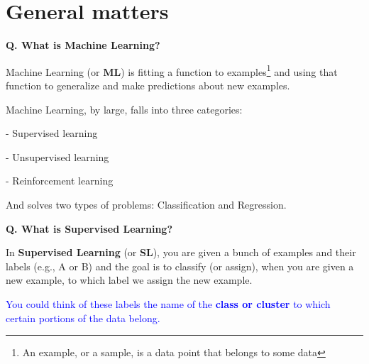 \section{General matters}
\begin{frame}[fragile]{\textbf{Q. What is Machine Learning?}}
  \begin{wideitemize}
    \item Machine Learning (or \textbf{ML}) is fitting a function to
    examples\footnote{An example, or a sample, is a data point that belongs
    to some data} and using that function to generalize and make predictions
    about new examples.
    \item Machine Learning, by large, falls into three categories:\vspace{.4em}
    \begin{wideitemize}
      \item[-] Supervised learning
      \item[-] Unsupervised learning
      \item[-] Reinforcement learning
    \end{wideitemize}
    \item And solves two types of problems: Classification and Regression.
  \end{wideitemize}
\end{frame}

\begin{frame}[fragile]{\textbf{Q. What is Supervised Learning?}}
  \begin{wideitemize}
    \item In \textbf{Supervised Learning} (or \textbf{SL}), you are given a
    bunch of examples and their labels (e.g., A or B) and the goal is to
    classify (or assign), when you are given a new example, to which label we
    assign the new example.
    \item \textcolor{blue}{You could think of these labels the name of the
    \textbf{class or cluster} to which certain portions of the data belong.}
  \end{wideitemize}
\end{frame}

